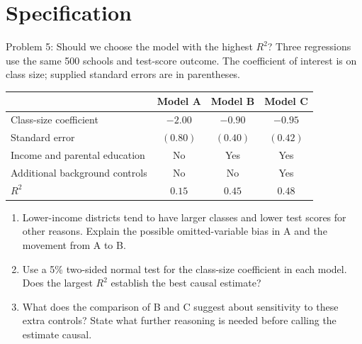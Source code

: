 \documentclass[notes,10pt, aspectratio=169]{beamer}
\begin{document}
\section{Specification}
\begin{frame}{Problem 5: Should we choose the model with the highest $R^2$?}
\small
Three regressions use the same 500 schools and test-score outcome. The coefficient of interest is on class size; supplied standard errors are in parentheses.
\begin{center}
\begin{tabular}{lccc}
\toprule
 & Model A & Model B & Model C\\
\midrule
Class-size coefficient & $-2.00$ & $-0.90$ & $-0.95$\\
Standard error & $(0.80)$ & $(0.40)$ & $(0.42)$\\
Income and parental education & No & Yes & Yes\\
Additional background controls & No & No & Yes\\
$R^2$ & $0.15$ & $0.45$ & $0.48$\\
\bottomrule
\end{tabular}
\end{center}
\begin{enumerate}
\item Lower-income districts tend to have larger classes and lower test scores for other reasons. Explain the possible omitted-variable bias in A and the movement from A to B.
\item Use a 5\% two-sided normal test for the class-size coefficient in each model. Does the largest $R^2$ establish the best causal estimate?
\item What does the comparison of B and C suggest about sensitivity to these extra controls? State what further reasoning is needed before calling the estimate causal.
\end{enumerate}
\end{frame}
\end{document}
